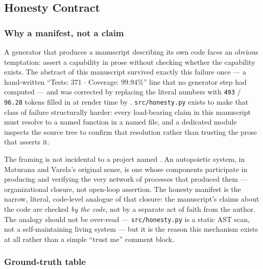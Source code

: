 \documentclass[
]{article}
\begin{document}
\newpage

\subsection{Honesty Contract}\label{honesty-contract}

\subsubsection{Why a manifest, not a
claim}\label{why-a-manifest-not-a-claim}

A generator that produces a manuscript describing its own code faces an
obvious temptation: assert a capability in prose without checking
whether the capability exists. The abstract of this manuscript survived
exactly this failure once --- a hand-written ``Tests: 371 \texorpdfstring{\ensuremath{\cdot}}{.} Coverage:
99.94\%'' line that no generator step had computed --- and was corrected
by replacing the literal numbers with \texttt{493} / \texttt{96.28}
tokens filled in at render time by
. \texttt{src/honesty.py}
exists to make that class of failure structurally harder: every
load-bearing claim in this manuscript must resolve to a named function
in a named file, and a dedicated module inspects the source tree to
confirm that resolution rather than trusting the prose that asserts it.

The framing is not incidental to a project named
. An autopoietic system, in Maturana and
Varela's original sense, is one whose components participate in
producing and verifying the very network of processes that produced them
\citep{maturana_varela_1980} --- organizational closure, not open-loop
assertion. The honesty manifest is the narrow, literal, code-level
analogue of that closure: the manuscript's claims about the code are
checked \emph{by the code}, not by a separate act of faith from the
author. The analogy should not be over-read --- \texttt{src/honesty.py}
is a static AST scan, not a self-maintaining living system --- but it is
the reason this mechanism exists at all rather than a simple ``trust
me'' comment block.

\subsubsection{Ground-truth table}\label{ground-truth-table}
\end{document}
